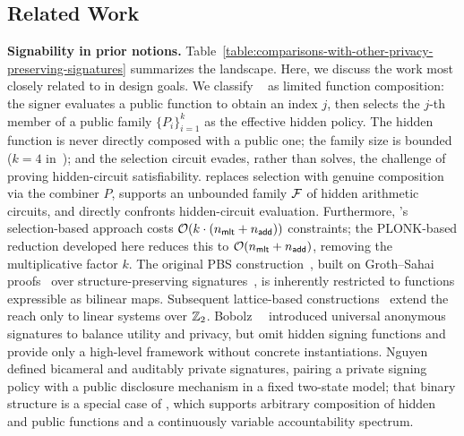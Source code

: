 \subsection{Related Work}\label{subsection:introduction-related-work}

\medskip
\noindent\textbf{Signability in prior notions.}
Table~\ref{table:comparisons-with-other-privacy-preserving-signatures} summarizes the landscape.
Here, we discuss the work most closely related to \SMS in design goals.
We classify \MPS~\cite{CRYPTO:NGSY22} as limited function composition:
the signer evaluates a public function to obtain an index $j$,
then selects the $j$-th member of a public family $\{P_i\}_{i = 1}^k$
as the effective hidden policy.
The hidden function is never directly composed with a public one;
the family size is bounded ($k = 4$ in~\cite{CRYPTO:NGSY22});
and the selection circuit evades, rather than solves,
the challenge of proving hidden-circuit satisfiability.
\SMS replaces selection with genuine composition via the combiner $P$,
supports an unbounded family $\mathcal{F}$ of hidden arithmetic circuits,
and directly confronts hidden-circuit evaluation.
Furthermore, \MPS's selection-based approach costs
$\mathcal{O}(k \cdot (n_\mathsf{mlt} + n_\mathsf{add}))$ constraints;
the PLONK-based reduction developed here reduces this to $\mathcal{O}(n_\mathsf{mlt} + n_\mathsf{add})$,
removing the multiplicative factor $k$.
The original PBS construction~\cite{PKC:BelFuc14},
built on Groth--Sahai proofs~\cite{EC:GroSah08}
over structure-preserving signatures~\cite{CRYPTO:AFGHO10},
is inherently restricted to functions expressible as bilinear maps.
Subsequent lattice-based constructions~\cite{ChengNW16,XuSNW22}
extend the reach only to linear systems over $\mathbb{Z}_2$.
Bobolz~\etal~\cite{FC:BobDiaKoh24} introduced universal anonymous signatures
to balance utility and privacy,
but omit hidden signing functions
and provide only a high-level framework without concrete instantiations.
Nguyen~\etal~\cite{AC:NRSX23} defined bicameral and auditably private signatures,
pairing a private signing policy with a public disclosure mechanism
in a fixed two-state model;
that binary structure is a special case of \SMS,
which supports arbitrary composition of hidden and public functions
and a continuously variable accountability spectrum.

